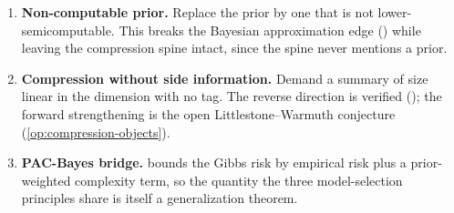 \begin{enumerate}[leftmargin=*,itemsep=3pt]
\item \textbf{Non-computable prior.} Replace the prior by one that is not lower-semicomputable. This breaks the Bayesian approximation edge () while leaving the compression spine intact, since the spine never mentions a prior.
\item \textbf{Compression without side information.} Demand a summary of size linear in the dimension with no tag. The reverse direction is verified (); the forward strengthening is the open Littlestone--Warmuth conjecture (\cref{op:compression-objects}).
\item \textbf{PAC-Bayes bridge.}  bounds the Gibbs risk by empirical risk plus a prior-weighted complexity term, so the quantity the three model-selection principles share is itself a generalization theorem.
\end{enumerate}
